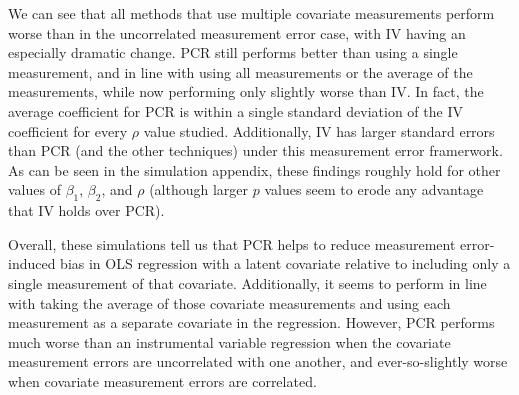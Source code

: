 \documentclass[10pt]{article}
\begin{document}
        \begin{table}[!htbp] \centering
            \caption{Average Coefficients for Values of $\rho$ (Correlated Measurement Errors) \label{sim_rho_5_exp}}
        \end{table}


        We can see that all methods that use multiple covariate measurements perform worse than in the uncorrelated measurement error case, with IV having an especially dramatic change. PCR still performs better than using a single measurement, and in line with using all measurements or the average of the measurements, while now performing only slightly worse than IV. In fact, the average coefficient for PCR is within a single standard deviation of the IV coefficient for every $\rho$ value studied. Additionally, IV has larger standard errors than PCR (and the other techniques) under this measurement error framerwork. As can be seen in the simulation appendix, these findings roughly hold for other values of $\beta_1$, $\beta_2$, and $\rho$ (although larger $p$ values seem to erode any advantage that IV holds over PCR).

        Overall, these simulations tell us that PCR helps to reduce measurement error-induced bias in OLS regression with a latent covariate relative to including only a single measurement of that covariate. Additionally, it seems to perform in line with taking the average of those covariate measurements and using each measurement as a separate covariate in the regression. However, PCR performs much worse than an instrumental variable regression when the covariate measurement errors are uncorrelated with one another, and ever-so-slightly worse when covariate measurement errors are correlated.
\end{document}
